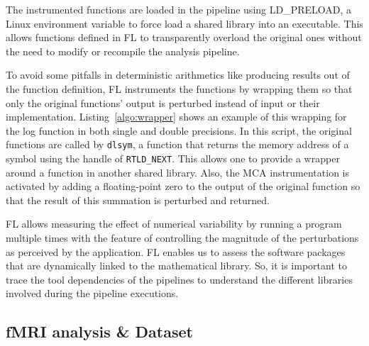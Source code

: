 \documentclass[conference]{IEEEtran}
\begin{document}
The instrumented functions are loaded in the pipeline using LD\_PRELOAD, a Linux environment variable
to force load a shared library into an executable. This allows functions defined in FL to transparently
overload the original ones without the need to modify or recompile the analysis pipeline.

To avoid some pitfalls in deterministic arithmetics like producing results out of the function definition,
FL instruments the functions by wrapping them so that only the original functions' output
is perturbed instead of input or their implementation.
Listing~\ref{algo:wrapper} shows an example of this wrapping for the log function in both single and double precisions.
In this script, the original functions are called by \texttt{dlsym},
a function that returns the memory address of a symbol using the handle of \texttt{RTLD\_NEXT}.
This allows one to provide a wrapper around a function in another shared library.
Also, the MCA instrumentation is activated by adding a floating-point zero to the output of the original function
so that the result of this summation is perturbed and returned.




%

FL allows measuring the effect of numerical variability by running a program multiple times
with the feature of controlling the magnitude of the perturbations as perceived by the application.
FL enables us to assess the software packages that are dynamically linked to the mathematical library.
So, it is important to trace the tool dependencies of the pipelines to understand the different libraries
involved during the pipeline executions.


\subsection{fMRI analysis \& Dataset}
\end{document}

